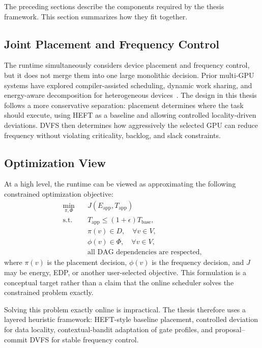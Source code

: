 The preceding sections describe the components required by the thesis framework. This section summarizes how they fit together.

\subsection{Joint Placement and Frequency Control}
\label{subsec:joint_placement_frequency}

The runtime simultaneously considers device placement and frequency control, but it does not merge them into one large monolithic decision. Prior multi-GPU systems have explored compiler-assisted scheduling, dynamic work sharing, and energy-aware decomposition for heterogeneous devices~\cite{Chen2022CASE,John2024WorkSharing,Zamani2023GreenMD}. The design in this thesis follows a more conservative separation: placement determines where the task should execute, using HEFT as a baseline and allowing controlled locality-driven deviations. DVFS then determines how aggressively the selected GPU can reduce frequency without violating criticality, backlog, and slack constraints.

\subsection{Optimization View}
\label{subsec:optimization_view}

At a high level, the runtime can be viewed as approximating the following constrained optimization objective:
\begin{align}
\min_{\pi,\Phi} \quad & J(E_{\mathrm{app}}, T_{\mathrm{app}}) \\
\mathrm{s.t.} \quad & T_{\mathrm{app}} \leq (1+\epsilon)T_{\mathrm{base}}, \\
& \pi(v) \in D, \quad \forall v \in V, \\
& \phi(v) \in \Phi, \quad \forall v \in V, \\
& \text{all DAG dependencies are respected},
\label{eq:runtime_optimization_problem}
\end{align}
where $\pi(v)$ is the placement decision, $\phi(v)$ is the frequency decision, and $J$ may be energy, EDP, or another user-selected objective. This formulation is a conceptual target rather than a claim that the online scheduler solves the constrained problem exactly.

Solving this problem exactly online is impractical. The thesis therefore uses a layered heuristic framework: HEFT-style baseline placement, controlled deviation for data locality, contextual-bandit adaptation of gate profiles, and proposal--commit DVFS for stable frequency control.

